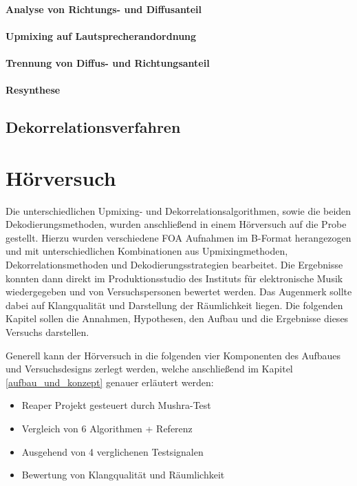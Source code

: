 \documentclass[12pt, a4paper]{article}
\begin{document}
        \paragraph{Analyse von Richtungs- und Diffusanteil}
        
        \paragraph{Upmixing auf Lautsprecherandordnung}
        
        \paragraph{Trennung von Diffus- und Richtungsanteil}
        
        \paragraph{Resynthese}
        

    \subsection{Dekorrelationsverfahren} \label{dekorrelation}
    

\newpage

\section{Hörversuch}
Die unterschiedlichen Upmixing- und Dekorrelationsalgorithmen, sowie die beiden Dekodierungsmethoden, wurden anschließend in einem Hörversuch auf die Probe gestellt. Hierzu wurden verschiedene FOA Aufnahmen im B-Format herangezogen und mit unterschiedlichen Kombinationen aus Upmixingmethoden, Dekorrelationsmethoden und Dekodierungsstrategien bearbeitet. Die Ergebnisse konnten dann direkt im Produktionsstudio des Instituts für elektronische Musik wiedergegeben und von Versuchspersonen bewertet werden. Das Augenmerk sollte dabei auf Klangqualität und Darstellung der Räumlichkeit liegen. Die folgenden Kapitel sollen die Annahmen, Hypothesen, den Aufbau und die Ergebnisse dieses Versuchs darstellen.

Generell kann der Hörversuch in die folgenden vier Komponenten des Aufbaues und Versuchsdesigns zerlegt werden, welche anschließend im Kapitel \ref{aufbau_und_konzept} genauer erläutert werden:
\begin{itemize}
    \item Reaper Projekt gesteuert durch Mushra-Test
    \item Vergleich von 6 Algorithmen + Referenz
    \item Ausgehend von 4 verglichenen Testsignalen
    \item Bewertung von Klangqualität und Räumlichkeit
\end{itemize}
\end{document}
